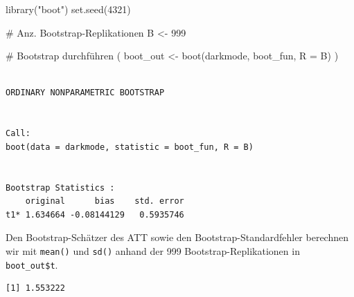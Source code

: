 \documentclass[
  a4paper,
  DIV=11,
  oneside]{scrreprt}
\newenvironment{Shaded}{\begin{snugshade}}{\end{snugshade}}
\newcommand{\AttributeTok}[1]{\textcolor[rgb]{0.40,0.45,0.13}{#1}}
\newcommand{\CommentTok}[1]{\textcolor[rgb]{0.37,0.37,0.37}{#1}}
\newcommand{\DecValTok}[1]{\textcolor[rgb]{0.68,0.00,0.00}{#1}}
\newcommand{\FunctionTok}[1]{\textcolor[rgb]{0.28,0.35,0.67}{#1}}
\newcommand{\NormalTok}[1]{\textcolor[rgb]{0.00,0.23,0.31}{#1}}
\newcommand{\OtherTok}[1]{\textcolor[rgb]{0.00,0.23,0.31}{#1}}
\newcommand{\SpecialCharTok}[1]{\textcolor[rgb]{0.37,0.37,0.37}{#1}}
\newcommand{\StringTok}[1]{\textcolor[rgb]{0.13,0.47,0.30}{#1}}
\begin{document}
\begin{Shaded}
\begin{Highlighting}[]
\FunctionTok{library}\NormalTok{(}\StringTok{"boot"}\NormalTok{)}
\FunctionTok{set.seed}\NormalTok{(}\DecValTok{4321}\NormalTok{)}

\CommentTok{\# Anz. Bootstrap{-}Replikationen}
\NormalTok{B }\OtherTok{\textless{}{-}} \DecValTok{999}

\CommentTok{\# Bootstrap durchführen}
\NormalTok{(}
\NormalTok{  boot\_out }\OtherTok{\textless{}{-}} \FunctionTok{boot}\NormalTok{(darkmode, boot\_fun, }\AttributeTok{R =}\NormalTok{ B)}
\NormalTok{)}
\end{Highlighting}
\end{Shaded}

\begin{verbatim}

ORDINARY NONPARAMETRIC BOOTSTRAP


Call:
boot(data = darkmode, statistic = boot_fun, R = B)


Bootstrap Statistics :
    original      bias    std. error
t1* 1.634664 -0.08144129   0.5935746
\end{verbatim}

Den Bootstrap-Schätzer des ATT sowie den Bootstrap-Standardfehler
berechnen wir mit \texttt{mean()} und \texttt{sd()} anhand der 999
Bootstrap-Replikationen in \texttt{boot\_out\$t}.

\begin{Shaded}
\end{Shaded}

\begin{verbatim}
[1] 1.553222
\end{verbatim}

\begin{Shaded}
\end{Shaded}
\end{document}
